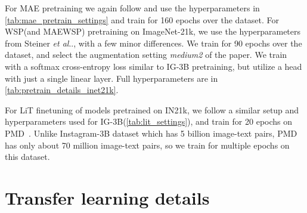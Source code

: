 \documentclass[10pt,twocolumn,letterpaper]{article}
\makeatletter
\DeclareRobustCommand\onedot{\futurelet\@let@token\@onedot}
\def\@onedot{\ifx\@let@token.\else.\null\fi\xspace}
\def\etal{\emph{et al}\onedot}
\newcommand{\lit}{LiT\xspace}
\newcommand{\mae}{MAE\xspace}
\newcommand{\ce}{WSP\xspace}
\newcommand{\ours}{MAEWSP\xspace}  \newcommand{\oursig}{\ours{}\textsubscript{IG}\xspace}
\newcommand{\igSizeShort}{IG-3B\xspace}
\newcommand{\igSize}{Instagram-3B\xspace}
\newcommand{\inetFull}{ImageNet-21k\xspace}
\newcommand{\inetFullShort}{IN21k\xspace}
\newcommand{\pmd}{PMD\xspace}
\makeatother
\begin{document}
For \mae pretraining we again follow \cite{he2021masked} and use the hyperparameters in \cref{tab:mae_pretrain_settings} and train
for 160 epochs over the dataset.
For \ce (and \ours) pretraining on \inetFull, we use the hyperparameters from Steiner \etal\cite{steiner2021train}, with a few minor
differences. We train for 90 epochs over the dataset,
and select the augmentation setting \textit{medium2} of the paper. We train with a softmax cross-entropy loss similar to \igSizeShort pretraining, but utilize a head with just a single linear layer.
Full hyperparameters are in \cref{tab:pretrain_details_inet21k}.


For \lit finetuning of models pretrained on \inetFullShort, we follow a similar setup and hyperparameters used for \igSizeShort (\cref{tab:lit_settings}),
and train for 20 epochs on \pmd~\cite{singh2022flava}.
Unlike \igSize dataset which has 5 billion image-text pairs, \pmd has only about 70 million image-text pairs, so we train for multiple epochs on this dataset.



\section{Transfer learning details}
\label{app:transfer_details}
\end{document}
